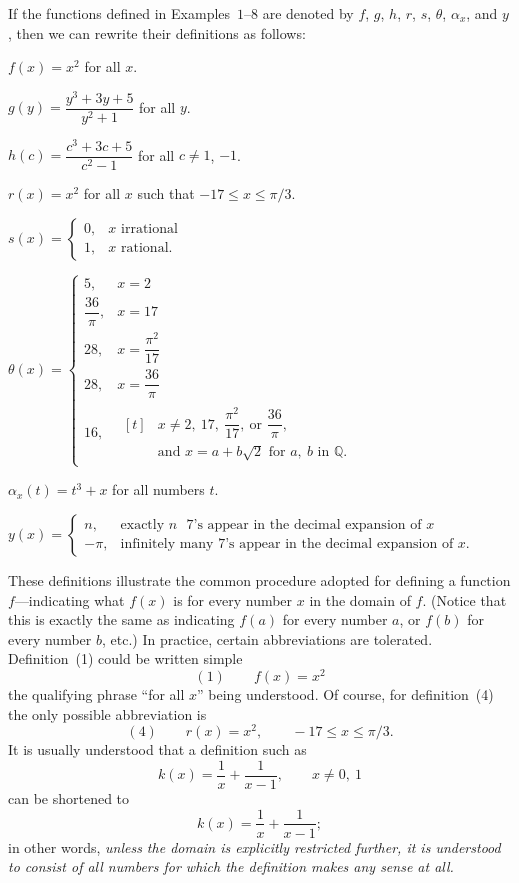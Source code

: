 If the functions defined in Examples~$1$--$8$ are denoted by $f$, $g$, $h$, $r$,
$s$, $\theta$, $\alpha_x$, and $y$, then we can rewrite their definitions as follows:
\begin{steps}
\item $f(x) = x^2$ \quad for all $x$.
\item $g(y) = \dfrac{y^3 + 3y + 5}{y^2 + 1}$ \quad for all $y$.
\item $h(c) = \dfrac{c^3 + 3c + 5}{c^2 - 1}$ \quad for all $c \neq 1$, $-1$.
\item $r(x) = x^2$ \quad for all $x$ such that $-17 \leq x \leq \pi/3$.
\item $\displaystyle s(x) =
\begin{cases}
0, & x\text{ irrational}\\
1, & x\text{ rational.}
\end{cases}$
\item $\displaystyle \theta(x) =
\begin{cases}
5, & x = 2\\[4pt]
\dfrac{36}{\pi}, & x = 17\\[8pt]
28, & x = \dfrac{\pi^2}{17}\\[8pt]
28, & x = \dfrac{36}{\pi}\\[8pt]
16, &
\begin{aligned}[t]
&x \neq 2,\ 17,\ \dfrac{\pi^2}{17},\ \text{or }\dfrac{36}{\pi},\\
&\text{and }x = a + b\sqrt{2}\text{ for }a,\ b\text{ in }\mathbb{Q}.
\end{aligned}
\end{cases}$
\item $\alpha_x(t) = t^3 + x$ \quad for all numbers $t$.
\item $\displaystyle y(x) =
\begin{cases}
n, & \text{exactly $n$ $7$'s appear in the decimal expansion of $x$}\\
-\pi, & \text{infinitely many $7$'s appear in the decimal expansion of $x$.}
\end{cases}$
\end{steps}

These definitions illustrate the common procedure adopted for defining a
function $f$---indicating what $f(x)$ is for every number $x$ in the domain of
$f$. (Notice that this is exactly the same as indicating $f(a)$ for every number
$a$, or $f(b)$ for every number $b$, etc.) In practice, certain abbreviations are
tolerated. Definition~(1) could be written simple
\[
(1)\qquad f(x) = x^2
\]
the qualifying phrase ``for all $x$'' being understood. Of course, for
definition~(4) the only possible abbreviation is
\[
(4)\qquad r(x) = x^2, \qquad -17 \leq x \leq \pi/3.
\]
It is usually understood that a definition such as
\[
k(x) = \frac{1}{x} + \frac{1}{x-1}, \qquad x \neq 0,\ 1
\]
can be shortened to
\[
k(x) = \frac{1}{x} + \frac{1}{x-1};
\]
in other words, \emph{unless the domain is explicitly restricted further, it is
understood to consist of all numbers for which the definition makes any sense
at all.}

